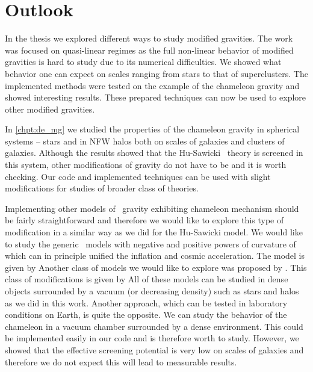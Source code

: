 \chapter{Outlook}
\label{chpt:outlook}
In the thesis we explored different ways to study modified gravities. The work was focused on quasi-linear regimes as the full non-linear behavior of modified gravities is hard to study due to its numerical difficulties. We showed what behavior one can expect on scales ranging from stars to that of superclusters. The implemented methods were tested on the example of the chameleon gravity and showed interesting results. These prepared techniques can now be used to explore other modified gravities.

In \autoref{chpt:de_mg} we studied the properties of the chameleon gravity in spherical systems -- stars and in NFW halos both on scales of galaxies and clusters of galaxies. Although the results showed that the Hu-Sawicki \fR\ theory is screened in this system, other modifications of gravity do not have to be and it is worth checking. Our code and implemented techniques can be used with slight modifications for studies of broader class of theories.

Implementing other models of \fR\ gravity exhibiting chameleon mechanism should be fairly straightforward and therefore we would like to explore this type of modification in a similar way as we did for the Hu-Sawicki model. We would like to study the generic \fR\ models with negative and positive powers of curvature of \textcite{2003PhRvD..68l3512N} which can in principle unified the inflation and cosmic acceleration. The model is given by
Another class of models we would like to explore was proposed by \textcite{2007JETPL..86..157S}. This class of modifications is given by
All of these models can be studied in dense objects surrounded by a vacuum (or decreasing density) such as stars and halos as we did in this work. Another approach, which can be tested in laboratory conditions on Earth, is quite the opposite. We can study the behavior of the chameleon in a vacuum chamber surrounded by a dense environment. This could be implemented easily in our code and is therefore worth to study. However, we showed that the effective screening potential is very low on scales of galaxies and therefore we do not expect this will lead to measurable results.

